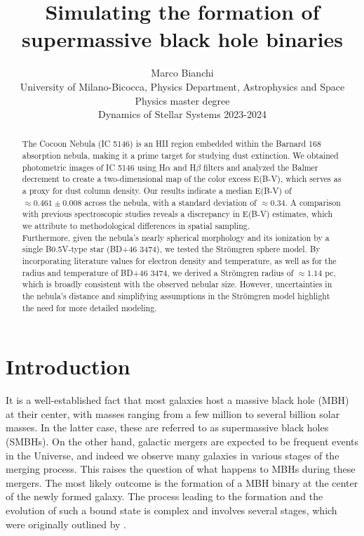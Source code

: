 \documentclass[fleqn,usenatbib]{mnras}
\title[]{Simulating the formation of supermassive black hole binaries}
\author[Marco Bianchi]{
Marco Bianchi
\\
University of Milano-Bicocca, Physics Department, Astrophysics and Space Physics master degree\\
Dynamics of Stellar Systems 2023-2024
}
\begin{document}
\label{firstpage}
\pagerange{\pageref{firstpage}--\pageref{lastpage}}
\maketitle

\begin{abstract}
  \large The Cocoon Nebula (IC 5146) is an HII region embedded within the Barnard 168 absorption nebula, making it a prime target for studying dust extinction. 
  We obtained photometric images of IC 5146 using H$\alpha$ and H$\beta$ filters and analyzed the Balmer decrement to create a two-dimensional map of the color excess E(B-V), which serves as a proxy for dust column density. 
  Our results indicate a median E(B-V) of $\approx 0.461 \pm 0.008$ across the nebula, with a standard deviation of $\approx 0.34$. 
  A comparison with previous spectroscopic studies reveals a discrepancy in E(B-V) estimates, which we attribute to methodological differences in spatial sampling.\\
  Furthermore, given the nebula's nearly spherical morphology and its ionization by a single B0.5V-type star (BD+46 3474), we tested the Strömgren sphere model. 
  By incorporating literature values for electron density and temperature, as well as for the radius and temperature of BD+46 3474, we derived a Strömgren radius of $\approx 1.14$ pc, which is broadly consistent with the observed nebular size. 
  However, uncertainties in the nebula's distance and simplifying assumptions in the Strömgren model highlight the need for more detailed modeling.
\end{abstract} 





\section{Introduction}\label{sec:introduction}
It is a well-established fact that most galaxies host a massive black hole (MBH) at their center, with masses ranging from a few million to several billion solar masses. In the latter case, these are referred to as supermassive black holes (SMBHs).
On the other hand, galactic mergers are expected to be frequent events in the Universe, and indeed we observe many galaxies in various stages of the merging process.
This raises the question of what happens to MBHs during these mergers.
The most likely outcome is the formation of a MBH binary at the center of the newly formed galaxy.
The process leading to the formation and the evolution of such a bound state is complex and involves several stages, which were originally outlined by \cite{Begelman1980}.
\end{document}
